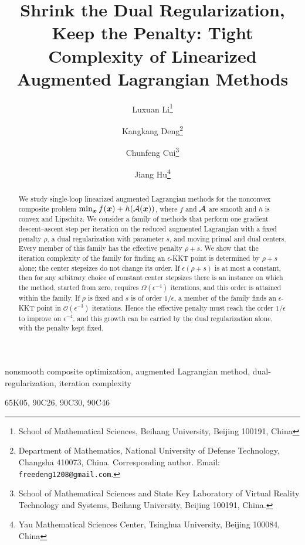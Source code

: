 \documentclass[review,onefignum,onetabnum,nohypdvips]{siamart220329}
\title{{Shrink the Dual Regularization, Keep the Penalty: Tight Complexity of Linearized Augmented Lagrangian Methods}}
\author{
Luxuan Li\thanks{School of Mathematical Sciences, Beihang University,
Beijing 100191, China}
\and Kangkang Deng\thanks{Department of Mathematics, National University of Defense Technology,
Changsha 410073, China. 
Corresponding author. Email: \texttt{freedeng1208@gmail.com}.
}
\and Chunfeng Cui\thanks{School of Mathematical Sciences and State Key Laboratory of Virtual Reality Technology and Systems,
Beihang University, Beijing 100191, China.}
\and Jiang Hu\thanks{Yau Mathematical Sciences Center, Tsinghua University,
Beijing 100084, China}
}
\begin{document}
\maketitle

\begin{abstract}
We study single-loop linearized augmented Lagrangian methods for the
nonconvex composite problem $\min_{\bm{x}} f(\bm{x})+h(\mathcal{A}(\bm{x}))$, where $f$ and
$\mathcal{A}$ are smooth and $h$ is convex and Lipschitz. We consider a family of
methods that perform one gradient descent--ascent step per iteration on the
reduced augmented Lagrangian with a fixed penalty $\rho$, a dual
regularization with parameter $s$, and moving primal and dual centers. Every
member of this family has the effective penalty $\rho+s$. We show that the
iteration complexity of the family for finding an $\epsilon$-KKT point is
determined by $\rho+s$ alone; the center stepsizes do not change its order.
If $\epsilon(\rho+s)$ is at most a constant, then for any arbitrary choice of
constant center stepsizes there is an instance on which the method, started
from zero, requires $\Omega(\epsilon^{-4})$ iterations, and this order is
attained within the family. If $\rho$ is fixed and $s$ is of order
$1/\epsilon$, a member of the family finds an $\epsilon$-KKT point in
$\mathcal O(\epsilon^{-3})$ iterations. Hence the effective penalty must reach
the order $1/\epsilon$ to improve on $\epsilon^{-4}$, and this growth can be
carried by the dual regularization alone, with the penalty kept fixed.
\end{abstract}

\begin{keywords}
nonsmooth composite optimization, augmented Lagrangian method, dual-regularization, iteration complexity
\end{keywords}

\begin{AMS}
65K05, 90C26, 90C30, 90C46
\end{AMS}







\appendix







\end{document}
